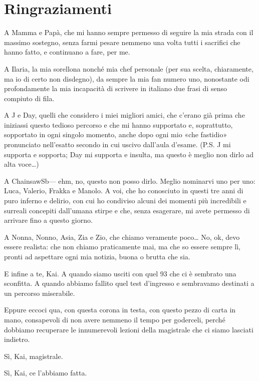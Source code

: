 \chapter*{Ringraziamenti}

A Mamma e Papà, che mi hanno sempre permesso di seguire la mia strada con il massimo sostegno, senza farmi pesare nemmeno una volta tutti i sacrifici che hanno fatto, e continuano a fare, per me.

A Ilaria, la mia sorellona nonché mia chef personale (per sua scelta, chiaramente, ma io di certo non disdegno), da sempre la mia fan numero uno, nonostante odi profondamente la mia incapacità di scrivere in italiano due frasi di senso compiuto di fila.

A J e Day, quelli che considero i miei migliori amici, che c'erano già prima che iniziassi questo tedioso percorso e che mi hanno supportato e, soprattutto, sopportato in ogni singolo momento, anche dopo ogni mio «che fastidio» pronunciato nell'esatto secondo in cui uscivo dall'aula d'esame. (P.S. J mi supporta e sopporta; Day mi supporta e insulta, ma questo è meglio non dirlo ad alta voce\ldots)

A ChainsawSb--- ehm, no, questo non posso dirlo. Meglio nominarvi uno per uno: Luca, Valerio, Frakka e Manolo. A voi, che ho conosciuto in questi tre anni di puro inferno e delirio, con cui ho condiviso alcuni dei momenti più incredibili e surreali concepiti dall'umana stirpe e che, senza esagerare, mi avete permesso di arrivare fino a questo giorno.

A Nonna, Nonno, Asia, Zia e Zio, che chiamo veramente poco\ldots{} No, ok, devo essere realista: che non chiamo praticamente mai, ma che so essere sempre lì, pronti ad aspettare ogni mia notizia, buona o brutta che sia.

E infine a te, Kai. A quando siamo usciti con quel 93 che ci è sembrato una sconfitta. A quando abbiamo fallito quel test d'ingresso e sembravamo destinati a un percorso miserabile.

Eppure eccoci qua, con questa corona in testa, con questo pezzo di carta in mano, consapevoli di non avere nemmeno il tempo per goderceli, perché dobbiamo recuperare le innumerevoli lezioni della magistrale che ci siamo lasciati indietro.

Sì, Kai, magistrale.

Sì, Kai, ce l'abbiamo fatta.
